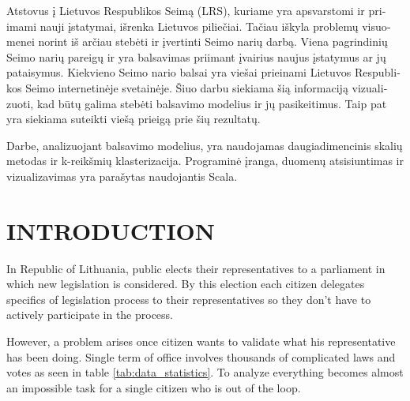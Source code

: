 \documentclass[a4paper,12pt]{article}
\begin{document}
	
	\begin{otherlanguage}{lithuanian}
		Atstovus į Lietuvos Respublikos Seimą (LRS), kuriame yra apsvarstomi ir priimami nauji įstatymai, išrenka Lietuvos piliečiai. Tačiau iškyla problemų visuomenei norint iš arčiau stebėti ir įvertinti Seimo narių darbą. Viena pagrindinių Seimo narių pareigų ir yra balsavimas priimant įvairius naujus įstatymus ar jų pataisymus. Kiekvieno Seimo nario balsai yra viešai prieinami Lietuvos Respublikos Seimo internetinėje svetainėje. Šiuo darbu siekiama šią informaciją vizualizuoti, kad būtų galima stebėti balsavimo modelius ir jų pasikeitimus. Taip pat yra siekiama suteikti viešą prieigą prie šių rezultatų.
		
		Darbe, analizuojant balsavimo modelius, yra naudojamas daugiadimencinis skalių metodas ir k-reikšmių klasterizacija. Programinė įranga, duomenų atsisiuntimas ir vizualizavimas yra parašytas naudojantis Scala.
		
	\end{otherlanguage}
	
	\clearpage
	
	\begingroup
	\singlespacing
	\tableofcontents
	\endgroup
	
	\clearpage
	
	\printglossary[type=\acronymtype,title={ACRONYMS}]
	
	\clearpage
	
	\printglossary[title={GLOSSARY}]
	
	\clearpage
	
	
	\section{INTRODUCTION}
	
	In Republic of Lithuania, public elects their representatives to a parliament in which new legislation is considered. By this election each citizen delegates specifics of legislation process to their representatives so they don't have to actively participate in the process.
	
	However, a problem arises once citizen wants to validate what his representative has been doing. Single term of office involves thousands of complicated laws and votes as seen in table \ref{tab:data_statistics}. To analyze everything becomes almost an impossible task for a single citizen who is out of the loop. 
	
\end{document}
